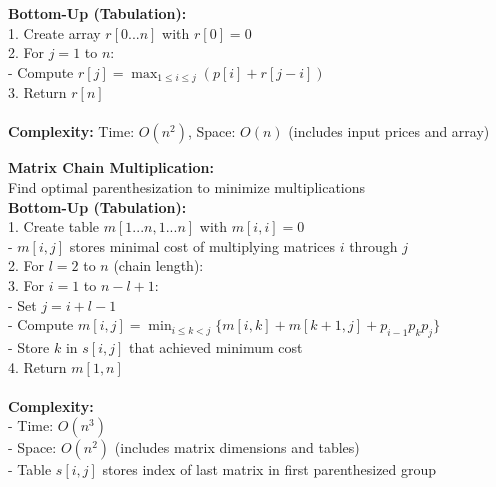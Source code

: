 {{\begin{minipage}[t]{\textwidth}
\begin{minipage}[t]{0.32\textwidth}
\textbf{Bottom-Up (Tabulation):}\\
1. Create array $r[0...n]$ with $r[0] = 0$\\
2. For $j = 1$ to $n$:\\
- Compute $r[j] = \max_{1\leq i\leq j}(p[i] + r[j-i])$\\
3. Return $r[n]$\\[2pt]
\\
\textbf{Complexity:} Time: $O(n^2)$, Space: $O(n)$ (includes input prices and array)
\end{minipage}
\hfill
\begin{minipage}[t]{0.32\textwidth}
\scriptsize
\textbf{Matrix Chain Multiplication:}\\
Find optimal parenthesization to minimize multiplications\\
\textbf{Bottom-Up (Tabulation):}\\
1. Create table $m[1...n, 1...n]$ with $m[i,i] = 0$\\
   - $m[i,j]$ stores minimal cost of multiplying matrices $i$ through $j$\\
2. For $l = 2$ to $n$ (chain length):\\
3. For $i = 1$ to $n-l+1$:\\
- Set $j = i+l-1$\\
- Compute $m[i,j] = \min_{i\leq k<j} \{m[i,k] + m[k+1,j] + p_{i-1}p_kp_j\}$\\
- Store $k$ in $s[i,j]$ that achieved minimum cost\\
4. Return $m[1,n]$\\[2pt]
\\
\textbf{Complexity:}\\
- Time: $O(n^3)$\\
- Space: $O(n^2)$ (includes matrix dimensions and tables)\\
- Table $s[i,j]$ stores index of last matrix in first parenthesized group
\end{minipage}
\end{minipage}
}} 